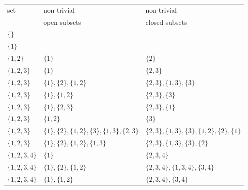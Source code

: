 \begin{tabular}{l|l|l}
  set&non-trivial&non-trivial\\
     &open subsets&closed subsets \\
  \hline
  $\{\}$             &                                                                                                 & \\
  \hline
  $\{1\}$            &                                                                                                 & \\
  \hline
  $\{1, 2\}$         & $\{1\}$                                                                                         & $\{2\}$\\
  \hline
  $\{1, 2, 3\}$      & $\{1\}$                                                                                         & $\{2, 3\}$ \\
  $\{1, 2, 3\}$      & $\{1\}, \{2\}, \{1, 2\}$                                                                        & $\{2, 3\}, \{1, 3\}, \{3\}$ \\
  $\{1, 2, 3\}$      & $\{1\}, \{1, 2\}$                                                                               & $\{2, 3\}, \{3\}$ \\
  $\{1, 2, 3\}$      & \sout{$\{1\}, \{2, 3\}$}                                                                        & \sout{$\{2, 3\}, \{1\}$} \\
  $\{1, 2, 3\}$      & $\{1, 2\}$                                                                                      & $\{3\}$ \\
  $\{1, 2, 3\}$      & \sout{$\{1\}, \{2\}, \{1, 2\}, \{3\}, \{1, 3\}, \{2, 3\}$}                                      & \sout{$\{2, 3\}, \{1, 3\}, \{3\}, \{1, 2\}, \{2\}, \{1\}$} \\
  $\{1, 2, 3\}$      & \sout{$\{1\}, \{2\}, \{1, 2\}, \{1, 3\}$}                                                       & \sout{$\{2, 3\}, \{1, 3\}, \{3\}, \{2\}$} \\
  \hline
  $\{1, 2, 3, 4\}$   & $\{1\}$                                                                                         & $\{2, 3, 4\}$ \\
  $\{1, 2, 3, 4\}$   & $\{1\}, \{2\}, \{1, 2\}$                                                                        & $\{2, 3, 4\}, \{1, 3, 4\}, \{3, 4\}$ \\
  $\{1, 2, 3, 4\}$   & $\{1\}, \{1, 2\}$                                                                               & $\{2, 3, 4\}, \{3, 4\}$ \\

\end{tabular}
